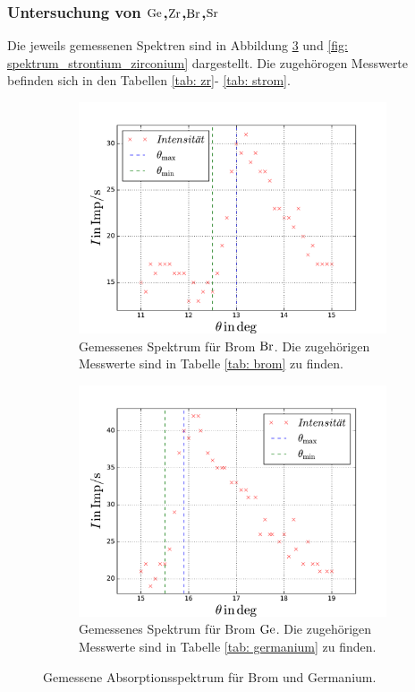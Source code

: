 \subsubsection{Untersuchung von $\ce{Ge}$,$\ce{Zr}$,$\ce{Br}$,$\ce{Sr}$} %
Die jeweils gemessenen Spektren sind in Abbildung \ref{fig: spektrum_brom_germanium} und %
\ref{fig: spektrum_strontium_zirconium} dargestellt. Die zugehörogen Messwerte befinden sich in den Tabellen \ref{tab: zr}- \ref{tab: strom}. %
\begin{figure}
  \centering
  \begin{subfigure}{0.48\textwidth}
    \centering
    \includegraphics[width=1 \textwidth]{../Messdaten/brom.pdf}
    \caption{Gemessenes Spektrum für Brom $\ce{Br}$. Die zugehörigen Messwerte sind in Tabelle \ref{tab: brom} zu finden.} %
    \label{fig: brom_spektrum}
  \end{subfigure}
  \begin{subfigure}{0.48\textwidth}
    \centering
    \includegraphics[width=1 \textwidth]{../Messdaten/germanium.pdf}
    \caption{Gemessenes Spektrum für Brom $\ce{Ge}$. Die zugehörigen Messwerte sind in Tabelle \ref{tab: germanium} zu finden.} %
    \label{fig: germaium_spektrum}
  \end{subfigure}
  \caption{Gemessene Absorptionsspektrum für Brom und Germanium.}
  \label{fig: spektrum_brom_germanium}
\end{figure}
